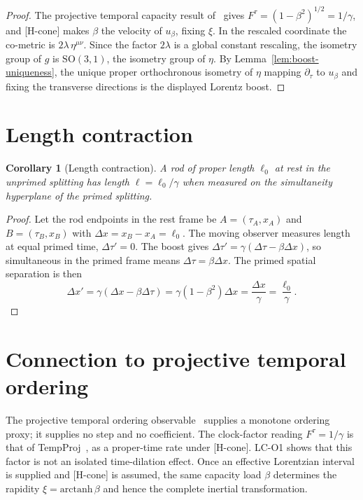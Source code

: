 \documentclass[12pt,a4paper]{article}
\newtheorem{corollary}[theorem]{Corollary}
\theoremstyle{remark}
\theoremstyle{definition}
\newcommand{\SO}{\mathrm{SO}}
\begin{document}
    \begin{proof}
      The projective temporal capacity result of~\cite{Beau2026n,Beau2026tp} gives
      $F^\tau = (1-\beta^2)^{1/2} = 1/\gamma$, and [H-cone] makes $\beta$ the velocity of $u_\beta$, fixing
      $\xi$.
      In the rescaled coordinate the co-metric is $2\lambda\,\eta^{\mu\nu}$.
      Since the factor $2\lambda$ is a global constant rescaling, the isometry group of $g$ is
      $\SO(3,1)$, the isometry group of $\eta$.
      By Lemma~\ref{lem:boost-uniqueness}, the unique proper orthochronous isometry of $\eta$
      mapping $\partial_\tau$ to $u_\beta$ and fixing the transverse directions is the
      displayed Lorentz boost.
    \end{proof}

  \section{Length contraction}
    \label{sec:contraction}

    \begin{corollary}[Length contraction]
      \label{cor:length-contraction}
      A rod of proper length $\ell_0$ at rest in the unprimed splitting has length
      $\ell = \ell_0/\gamma$ when measured on the simultaneity hyperplane of the primed
      splitting.
    \end{corollary}

    \begin{proof}
      Let the rod endpoints in the rest frame be $A = (\tau_A, x_A)$ and
      $B = (\tau_B, x_B)$ with $\Delta x = x_B - x_A = \ell_0$.
      The moving observer measures length at equal primed time, $\Delta\tau' = 0$.
      The boost gives $\Delta\tau' = \gamma(\Delta\tau - \beta\Delta x)$,
      so simultaneous in the primed frame means $\Delta\tau = \beta\Delta x$.
      The primed spatial separation is then
      \[
        \Delta x'
        = \gamma(\Delta x - \beta\Delta\tau)
        = \gamma(1-\beta^2)\Delta x
        = \frac{\Delta x}{\gamma}
        = \frac{\ell_0}{\gamma}.
      \]
    \end{proof}

  \section{Connection to projective temporal ordering}
    \label{sec:pto}

    The projective temporal ordering observable~\cite{Beau2026pto} supplies a monotone ordering proxy; it supplies no
    step and no coefficient.
    The clock-factor reading $F^\tau = 1/\gamma$ is that of TempProj~\cite{Beau2026tp}, as a proper-time rate
    under [H-cone].
    LC-O1 shows that this factor is not an isolated time-dilation effect.
    Once an effective Lorentzian interval is supplied and [H-cone] is assumed, the same capacity load $\beta$
    determines the rapidity $\xi = \mathrm{arctanh}\,\beta$ and hence the complete inertial
    transformation.
\end{document}
